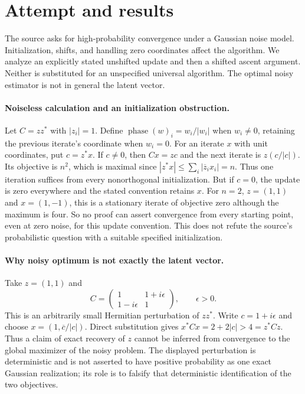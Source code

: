 \documentclass[11pt]{article}
\begin{document}
\section{Attempt and results}
The source asks for high-probability convergence under a Gaussian noise
model. Initialization, shifts, and handling zero coordinates affect the
algorithm. We analyze an explicitly stated unshifted update and then a
shifted ascent argument. Neither is substituted for an unspecified universal
algorithm. The optimal noisy estimator is not in general the latent vector.

\paragraph{Noiseless calculation and an initialization obstruction.}
Let $C=zz^*$ with $|z_i|=1$. Define $\operatorname{phase}(w)_i=w_i/|w_i|$
when $w_i\ne0$, retaining the previous iterate's coordinate when $w_i=0$.
For an iterate $x$ with unit coordinates, put $c=z^*x$. If $c\ne0$, then
$Cx=zc$ and the next iterate is $z(c/|c|)$. Its objective is $n^2$,
which is maximal since $|z^*x|\le\sum_i|\overline z_ix_i|=n$.
Thus one iteration suffices from every nonorthogonal initialization.
But if $c=0$, the update is zero everywhere and the stated convention
retains $x$. For $n=2$, $z=(1,1)$ and $x=(1,-1)$, this is a stationary
iterate of objective zero although the maximum is four. So no proof can
assert convergence from every starting point, even at zero noise, for this
update convention. This does not refute the source's probabilistic question
with a suitable specified initialization.

\paragraph{Why noisy optimum is not exactly the latent vector.}
Take $z=(1,1)$ and
\[
C=\begin{pmatrix}1&1+i\epsilon\\1-i\epsilon&1\end{pmatrix},\qquad\epsilon>0.
\]
This is an arbitrarily small Hermitian perturbation of $zz^*$. Write
$c=1+i\epsilon$ and choose $x=(1,\overline c/|c|)$. Direct substitution
gives $x^*Cx=2+2|c|>4=z^*Cz$. Thus a claim of exact recovery of $z$ cannot
be inferred from convergence to the global maximizer of the noisy problem.
The displayed perturbation is deterministic and is not asserted to have
positive probability as one exact Gaussian realization; its role is to
falsify that deterministic identification of the two objectives.
\end{document}

